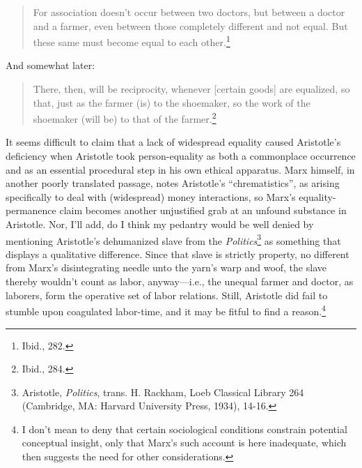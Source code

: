 \documentclass[12pt]{article}
\begin{document}
\begin{quote}
\begin{singlespace}
For association doesn't occur between two doctors, but between a doctor and a farmer, even between those completely different and not equal. But these same must become equal to each other.\footnote{Ibid., 282.}
\end{singlespace}
\end{quote}

\noindent And somewhat later:

\begin{quote}
\begin{singlespace}
There, then, will be reciprocity, whenever [certain goods] are equalized, so that, just as the farmer (is) to the shoemaker, so the work of the shoemaker (will be) to that of the farmer.\footnote{Ibid., 284.}
\end{singlespace}
\end{quote}

\noindent It seems difficult to claim that a lack of widespread equality caused Aristotle's deficiency when Aristotle took person-equality as both a commonplace occurrence and as an essential procedural step in his own ethical apparatus. Marx himself, in another poorly translated passage, notes Aristotle's ``chrematistics'', as arising specifically to deal with (widespread) money interactions, so Marx's equality-permanence claim becomes another unjustified grab at an unfound substance in Aristotle. Nor, I'll add, do I think my pedantry would be well denied by mentioning Aristotle's dehumanized slave from the \textit{Politics}\footnote{Aristotle, \textit{Politics}, trans. H. Rackham, Loeb Classical Library 264 (Cambridge, MA: Harvard University Press, 1934), 14-16.} as something that displays a qualitative difference. Since that slave is strictly property, no different from Marx's disintegrating needle unto the yarn's warp and woof, the slave thereby wouldn't count as labor, anyway---i.e., the unequal farmer and doctor, as laborers, form the operative set of labor relations. Still, Aristotle did fail to stumble upon coagulated labor-time, and it may be fitful to find a reason.\footnote{I don't mean to deny that certain sociological conditions constrain potential conceptual insight, only that Marx's such account is here inadequate, which then suggests the need for other considerations.}
\end{document}
